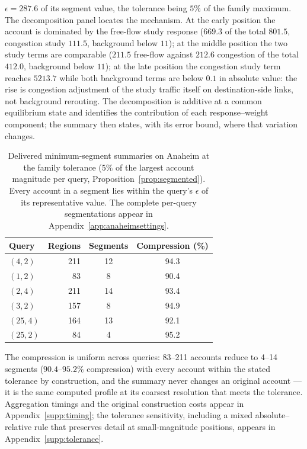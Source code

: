$\epsilon=287.6$ of its segment value, the tolerance being $5\%$ of the
family maximum. The decomposition panel locates the mechanism. At the
early position the account is dominated by the free-flow study response
($669.3$ of the total $801.5$, congestion study $111.5$, background
below $11$); at the middle position the two study terms are comparable
($211.5$ free-flow against $212.6$ congestion of the total $412.0$,
background below $11$); at the late position the congestion study term
reaches $5213.7$ while both background terms are below $0.1$ in
absolute value: the rise is congestion adjustment of the study traffic
itself on destination-side links, not background rerouting. The
decomposition is additive at a common equilibrium state and identifies
the contribution of each response--weight component; the summary then
states, with its error bound, where that variation changes.
\begin{table}[t]\centering\footnotesize
\caption{Delivered minimum-segment summaries on Anaheim at the family
tolerance ($5\%$ of the largest account magnitude per query,
Proposition~\ref{prop:segmented}). Every account in a segment lies
within the query's $\epsilon$ of its representative value. The complete
per-query segmentations appear in
Appendix~\ref{app:anaheimsettings}.}\label{tab:anaheimsegments}
\setlength{\tabcolsep}{4pt}
\begin{tabular*}{\tblwidth}{@{\extracolsep{\fill}}lrcc}
\toprule
Query & Regions & Segments & Compression (\%)\\
\midrule
$(4,2)$ & 211 & 12 & 94.3\\
$(1,2)$ & 83 & 8 & 90.4\\
$(2,4)$ & 211 & 14 & 93.4\\
$(3,2)$ & 157 & 8 & 94.9\\
$(25,4)$ & 164 & 13 & 92.1\\
$(25,2)$ & 84 & 4 & 95.2\\
\bottomrule\end{tabular*}\end{table}
The compression is uniform across queries: 83--211 accounts reduce to
4--14 segments ($90.4$--$95.2\%$ compression) with every account within
the stated tolerance by construction, and the summary never changes an
original account --- it is the same computed profile at its coarsest
resolution that meets the tolerance. Aggregation timings and the original construction
costs appear in Appendix~\ref{supp:timing}; the tolerance sensitivity,
including a mixed absolute--relative rule that preserves detail at
small-magnitude positions, appears in Appendix~\ref{supp:tolerance}.

